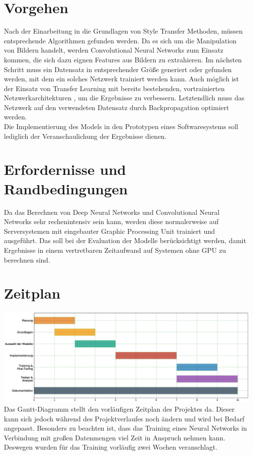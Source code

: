 \section{Vorgehen}
Nach der Einarbeitung in die Grundlagen von Style Transfer \cite{DBLP:journals/corr/GatysEB15a} \cite{DBLP:journals/corr/JohnsonAL16} Methoden,
müssen entsprechende Algorithmen gefunden werden. Da es sich um die Manipulation von Bildern handelt, werden Convolutional Neural Networks
\cite{lecun-gradientbased-learning-applied-1998} zum Einsatz kommen, die sich dazu eignen Features aus Bildern zu extrahieren. 
Im nächsten Schritt muss ein Datensatz in entsprechender Größe generiert oder gefunden werden, mit dem ein solches Netzwerk trainiert 
werden kann. Auch möglich ist der Einsatz von Transfer Learning mit bereits bestehenden, vortrainierten Netzwerkarchitekturen
\cite{DBLP:journals/corr/SimonyanZ14a}, um die Ergebnisse zu verbessern. Letztendlich muss das Netzwerk auf den verwendeten Datensatz durch
Backpropagation \cite{doi:10.1162/neco.1989.1.4.541} optimiert werden.
\\
Die Implementierung des Models in den Prototypen eines Softwaresystems soll lediglich der Veranschaulichung der Ergebnisse dienen.

\pagebreak

\section{Erfordernisse und Randbedingungen}
Da das Berechnen von Deep Neural Networks und Convolutional Neural Networks sehr rechenintensiv sein kann,
werden diese normalerweise auf Serversystemen mit eingebauter Graphic Processing Unit trainiert und ausgeführt. Das soll bei der Evaluation der 
Modelle berücksichtigt werden, damit Ergebnisse in einem vertretbaren Zeitaufwand auf Systemen ohne GPU zu berechnen sind.

\section{Zeitplan}
\includegraphics[width=1.00\textwidth]{resources/gantt.eps}
Das Gantt-Diagramm stellt den vorläufigen Zeitplan des Projektes da.
Dieser kann sich jedoch während des Projektverlaufes noch ändern und wird bei Bedarf angepasst.
Besonders zu beachten ist, dass das Training eines Neural Networks in Verbindung mit großen Datenmengen viel Zeit in Anspruch nehmen kann.
Deswegen wurden für das Training vorläufig zwei Wochen veranschlagt.

